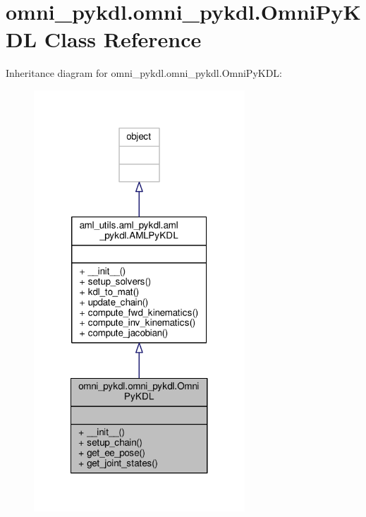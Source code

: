 \hypertarget{classomni__pykdl_1_1omni__pykdl_1_1_omni_py_k_d_l}{\section{omni\-\_\-pykdl.\-omni\-\_\-pykdl.\-Omni\-Py\-K\-D\-L Class Reference}
\label{classomni__pykdl_1_1omni__pykdl_1_1_omni_py_k_d_l}
}


Inheritance diagram for omni\-\_\-pykdl.\-omni\-\_\-pykdl.\-Omni\-Py\-K\-D\-L\-:
\nopagebreak
\begin{figure}[H]
\begin{center}
\leavevmode
\includegraphics[width=224pt]{classomni__pykdl_1_1omni__pykdl_1_1_omni_py_k_d_l__inherit__graph}
\end{center}
\end{figure}


